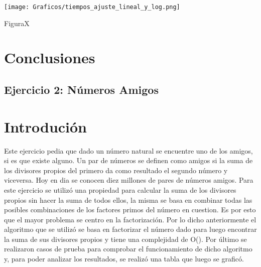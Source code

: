 \documentclass[a4paper, 12pt] {article}
\begin{document}
\begin{center}
\texttt{[image: Graficos/tiempos\_ajuste\_lineal\_y\_log.png]}
\begin{center}
FiguraX
\end{center}
\end{center}

\section*{Conclusiones}

\newpage

\begin{center}
\section*{Ejercicio 2: N\'umeros Amigos}
\end{center}

\bigskip
\section*{Introduci\'on}
Este ejercicio pedia que dado un n\'umero natural se encuentre uno de los amigos, si es que existe alguno.
Un par de n\'umeros se definen como amigos si la suma de los divisores propios del primero da como resultado el segundo n\'umero y viceversa. Hoy en dia se conocen diez millones de pares de n\'umeros amigos.
Para este ejercicio se utiliz\'o una propiedad para calcular la suma de los divisores propios sin hacer la suma de todos ellos, la misma se basa en combinar todas las posibles combinaciones de los factores primos del n\'umero en cuestion. Es por esto que el mayor problema se centro en la factorizaci\'on.
Por lo dicho anteriormente el algoritmo que se utiliz\'o se basa en factorizar el n\'umero dado para luego encontrar la suma de sus divisores propios y tiene una complejidad de O(). Por \'ultimo se realizaron casos de prueba para comprobar el funcionamiento de dicho algoritmo y, para poder analizar los resultados, se realiz\'o una tabla que luego se grafic\'o. 
\end{document}

